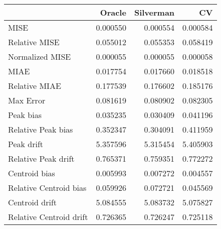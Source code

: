 \begin{tabular}{lrrr}
  \hline
 & Oracle & Silverman & CV \\ 
  \hline
MISE & 0.000550 & 0.000554 & 0.000584 \\ 
  Relative MISE & 0.055012 & 0.055353 & 0.058419 \\ 
  Normalized MISE & 0.000055 & 0.000055 & 0.000058 \\ 
  MIAE & 0.017754 & 0.017660 & 0.018518 \\ 
  Relative MIAE & 0.177539 & 0.176602 & 0.185176 \\ 
  Max Error & 0.081619 & 0.080902 & 0.082305 \\ 
  Peak bias & 0.035235 & 0.030409 & 0.041196 \\ 
  Relative Peak bias & 0.352347 & 0.304091 & 0.411959 \\ 
  Peak drift & 5.357596 & 5.315454 & 5.405903 \\ 
  Relative Peak drift & 0.765371 & 0.759351 & 0.772272 \\ 
  Centroid bias & 0.005993 & 0.007272 & 0.004557 \\ 
  Relative Centroid bias & 0.059926 & 0.072721 & 0.045569 \\ 
  Centroid drift & 5.084555 & 5.083732 & 5.075827 \\ 
  Relative Centroid drift & 0.726365 & 0.726247 & 0.725118 \\ 
   \hline
\end{tabular}
